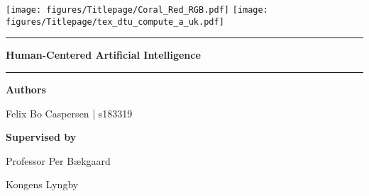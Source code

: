 \begin{titlepage}
    \raggedright
    \texttt{[image: figures/Titlepage/Coral\_Red\_RGB.pdf]}
    \hfill
    \texttt{[image: figures/Titlepage/tex\_dtu\_compute\_a\_uk.pdf]}
    \begin{center}
        \vspace{3 cm}
        \hrule
        \vspace{.3cm}
        { \huge {\bfseries {\opgavetitel}}
        } 
        
        \vspace{.1cm}
        { \LARGE {\bfseries 
            {
                Human-Centered Artificial Intelligence
            }
        }
        }
        \vspace{.5cm}
        
        \hrule
        \vspace{1.5cm}
        
        \textbf{Authors}\\
        \vspace{.5cm}
        \centering
        
        Felix Bo Caspersen | s183319\\
        
        \vspace{1.5cm}
        
        \textbf{Supervised by}\\
        \vspace{.5cm}
        \centering
        
        Professor Per Bækgaard \\
        \vspace{1.5cm}
        
        Kongens Lyngby \\
        \centering \datoen %
    \end{center}
\end{titlepage}